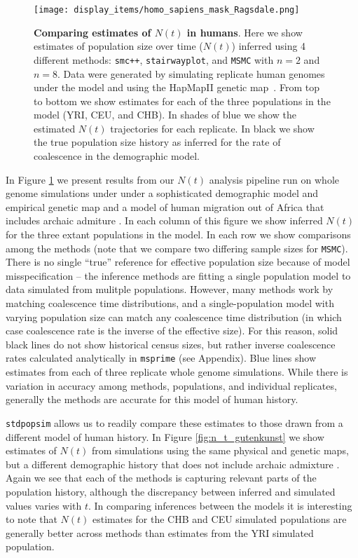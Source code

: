 \documentclass[12pt,halfline,a4paper]{ouparticle}
\newcommand{\stdpopsim}{\texttt{stdpopsim}\xspace}
\newcommand{\MSMC}{\texttt{MSMC}\xspace}
\newcommand{\smcpp}{\texttt{smc++}\xspace}
\begin{document}
\begin{figure}
\begin{center}
\texttt{[image: display\_items/homo\_sapiens\_mask\_Ragsdale.png]}
\caption{\textbf{Comparing estimates of $N(t)$ in humans}. Here we show estimates of population
size over time ($N(t)$) inferred using 4 different methods: \smcpp, \texttt{stairwayplot}, and
\MSMC with $n=2$ and $n=8$. Data were generated by simulating
replicate human genomes under the \cite{ragsdale2019models} model and using the
HapMapII genetic map~\citep{international2007second}. From top to bottom we show estimates for each
of the three populations in the model (YRI, CEU, and CHB). In shades of blue we show the estimated
$N(t)$ trajectories for each replicate. In black we show the true population size history as inferred
for the rate of coalescence in the demographic model.}
\label{fig:n_t_ragsdale}
\end{center}
\end{figure}


In Figure \ref{fig:n_t_ragsdale} we present results from our $N(t)$ analysis pipeline
run on whole genome simulations under under a sophisticated demographic model
and empirical genetic map and a model of human migration out of Africa
that includes archaic admiture \citep{ragsdale2019models}. In each column of this figure
we show inferred $N(t)$ for the three extant populations in the model.
In each row we show comparisons among the methods (note that we compare two differing
sample sizes for \MSMC).
There is no single ``true'' reference for effective population size
because of model misspecification -- the inference methods are fitting a single population model
to data simulated from mulitple populations.
However, many methods work by matching coalescence time distributions,
and a single-population model with varying population size can match any coalescence time distribution
(in which case coalescence rate is the inverse of the effective size).
For this reason, solid black lines do not show historical census sizes,
but rather inverse coalescence rates calculated analytically in \texttt{msprime} (see Appendix).
Blue lines show estimates from each of three replicate whole genome simulations.
While there is variation in accuracy among methods, populations, and individual replicates,
generally the methods are accurate for this model of human history.

\stdpopsim allows us to readily compare these estimates to those drawn from a different
model of human history. In Figure \ref{fig:n_t_gutenkunst} we show estimates of
$N(t)$ from simulations using the same physical and genetic maps, but a different demographic
history that does not include archaic admixture \citep{gutenkunst2009inferring}. Again we see that each
of the methods is capturing relevant parts of the population history, although the
discrepancy between inferred and simulated values varies with $t$. In comparing inferences between the
models it is interesting to note that $N(t)$ estimates for the CHB and CEU
simulated populations are generally better across methods than estimates from the YRI
simulated population.
\end{document}
